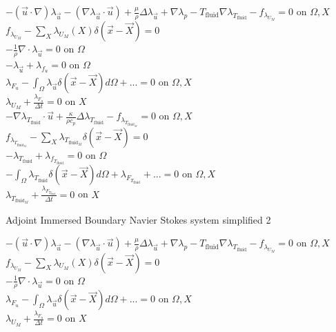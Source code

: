 \documentclass[10pt]{article} %
\begin{document}
\begin{center}
\begin{flushleft}
\end{flushleft}
	$-(\vec{u}\cdot\nabla) \lambda_{\vec{u}} - \left(\nabla \lambda_{\vec{u}} \cdot \vec{u}\right) + \frac{\mu}{\rho} \Delta \lambda_{\vec{u}} + \nabla\lambda_p - T_{\text{fluid}} \nabla \lambda_{T_{\text{fluid}}} - f_{\lambda_{U_M}} = 0$ \quad on $\Omega,X$\\
	$f_{\lambda_{U_M}} - \sum_X \lambda_{U_M}(X) \delta(\vec{x}-\vec{X}) = 0$\\
	$-\frac{1}{\rho} \nabla \cdot \lambda_{\vec{u}} = 0$ \quad on $\Omega$\\
	$-\lambda_{\vec{u}} + \lambda_{f_u} = 0$ \quad on $\Omega$\\
	$\lambda_{F_u} - \int_{\Omega} \lambda_{\vec{u}} \delta (\vec{x}-\vec{X}) d\Omega + ... = 0$ \quad on $\Omega,X$\\
	$\lambda_{U_M} + \frac{\lambda_{F_u}}{\Delta t}=0$ \quad on $X$\\
	$-\nabla \lambda_{T_{\text{fluid}}} \cdot \vec{u} + \frac{\kappa}{\rho c_p} \Delta  \lambda_{T_{\text{fluid}}} - f_{\lambda_{T_{\text{fluid}_M}}} = 0$ \quad on $\Omega,X$\\
	$f_{\lambda_{T_{\text{fluid}_M}}} - \sum_{X} \lambda_{T_{\text{fluid}_M}} \delta (\vec{x}-\vec{X}) = 0$\\
	$- \lambda_{T_{\text{fluid}}} +\lambda_{f_{T_{\text{fluid}}}} = 0$ \quad on $\Omega$\\
	$-\int_{\Omega} \lambda_{T_{\text{fluid}}} \delta (\vec{x}-\vec{X}) d\Omega + \lambda_{F_{T_{\text{fluid}}}} + ... = 0$ \quad on $\Omega, X$\\
	$\lambda_{T_{\text{fluid}_M}} + \frac{\lambda_{F_{T_{\text{fluid}}}}}{\Delta t} =0$ \quad on $X$
\begin{flushleft}
	Adjoint Immersed Boundary Navier Stokes system simplified 2
\end{flushleft}
	$-(\vec{u}\cdot\nabla) \lambda_{\vec{u}} - \left(\nabla \lambda_{\vec{u}} \cdot \vec{u}\right) + \frac{\mu}{\rho} \Delta \lambda_{\vec{u}} + \nabla\lambda_p - T_{\text{fluid}} \nabla \lambda_{T_{\text{fluid}}} - f_{\lambda_{U_M}} = 0$ \quad on $\Omega,X$\\
	$f_{\lambda_{U_M}} - \sum_X \lambda_{U_M}(X) \delta(\vec{x}-\vec{X}) = 0$\\
	$-\frac{1}{\rho} \nabla \cdot \lambda_{\vec{u}} = 0$ \quad on $\Omega$\\
	$\lambda_{F_u} - \int_{\Omega} \lambda_{\vec{u}} \delta (\vec{x}-\vec{X}) d\Omega + ... = 0$ \quad on $\Omega,X$\\
	$\lambda_{U_M} + \frac{\lambda_{F_u}}{\Delta t}=0$ \quad on $X$\\

\end{center}
\end{document}
